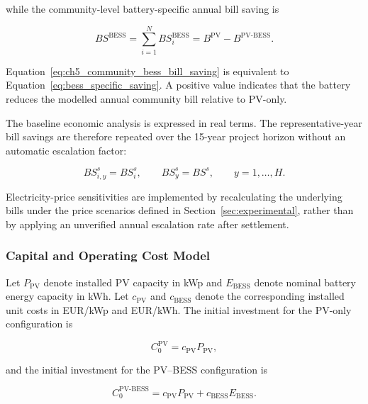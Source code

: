 while the community-level battery-specific annual bill saving is

\begin{equation}
BS^{\mathrm{BESS}}=\sum_{i=1}^{N}BS_i^{\mathrm{BESS}}
=B^{\mathrm{PV}}-B^{\mathrm{PV\mbox{-}BESS}}.
\label{eq:ch5_community_bess_bill_saving}
\end{equation}

Equation~\eqref{eq:ch5_community_bess_bill_saving} is equivalent to Equation~\eqref{eq:bess_specific_saving}. A positive value indicates that the battery reduces the modelled annual community bill relative to PV-only.

The baseline economic analysis is expressed in real terms. The representative-year bill savings are therefore repeated over the 15-year project horizon without an automatic escalation factor:

\begin{equation}
BS_{i,y}^{s}=BS_i^{s},
\qquad
BS_y^{s}=BS^{s},
\qquad y=1,\ldots,H.
\label{eq:ch5_repeated_real_bill_savings}
\end{equation}

Electricity-price sensitivities are implemented by recalculating the underlying bills under the price scenarios defined in Section~\ref{sec:experimental}, rather than by applying an unverified annual escalation rate after settlement.

\subsubsection{Capital and Operating Cost Model}
\label{sec:ch5_cost_model}

Let $P_{\mathrm{PV}}$ denote installed PV capacity in kWp and $E_{\mathrm{BESS}}$ denote nominal battery energy capacity in kWh. Let $c_{\mathrm{PV}}$ and $c_{\mathrm{BESS}}$ denote the corresponding installed unit costs in EUR/kWp and EUR/kWh. The initial investment for the PV-only configuration is

\begin{equation}
C_0^{\mathrm{PV}}=c_{\mathrm{PV}}P_{\mathrm{PV}},
\label{eq:ch5_pv_capex}
\end{equation}

and the initial investment for the PV--BESS configuration is

\begin{equation}
C_0^{\mathrm{PV\mbox{-}BESS}}
=c_{\mathrm{PV}}P_{\mathrm{PV}}+c_{\mathrm{BESS}}E_{\mathrm{BESS}}.
\label{eq:ch5_pv_bess_capex}
\end{equation}

